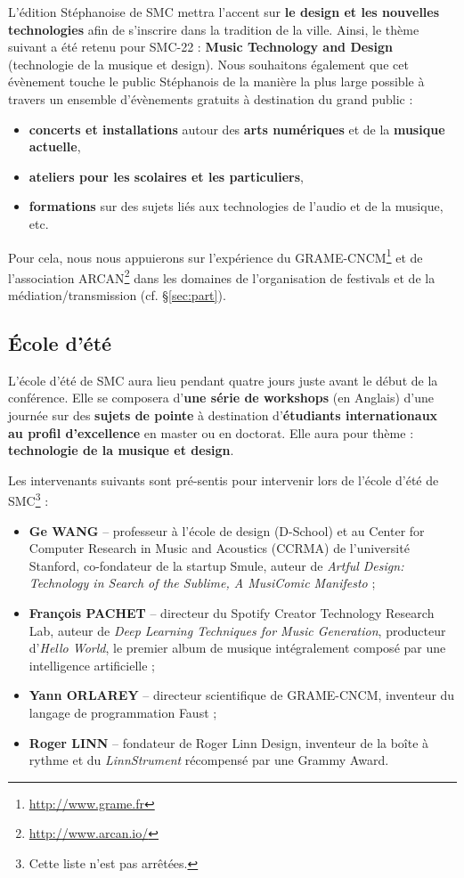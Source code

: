 \documentclass[fontsize=12pt]{scrartcl} %
\numberwithin{equation}{section} %
\numberwithin{figure}{section} %
\numberwithin{table}{section} %
\begin{document}
L'édition Stéphanoise de SMC mettra l'accent sur \textbf{le design et les nouvelles technologies} afin de s'inscrire dans la tradition de la ville. Ainsi, le thème suivant a été retenu pour SMC-22 : \textbf{Music Technology and Design} (technologie de la musique et design). Nous souhaitons également que cet évènement touche le public Stéphanois de la manière la plus large possible à travers un ensemble d'évènements gratuits à destination du grand public : 

\begin{itemize}
\item \textbf{concerts et installations} autour des \textbf{arts numériques} et de la \textbf{musique actuelle},
\item \textbf{ateliers pour les scolaires et les particuliers},
\item \textbf{formations} sur des sujets liés aux technologies de l'audio et de la musique, etc. 
\end{itemize}

Pour cela, nous nous appuierons sur l'expérience du GRAME-CNCM\footnote{\url{http://www.grame.fr}} et de l'association ARCAN\footnote{\url{http://www.arcan.io/}} dans les domaines de l'organisation de festivals et de la médiation/transmission (cf. \S\ref{sec:part}).  

\subsection{École d'été}
\label{subsec:summerSchool}

L'école d'été de SMC aura lieu pendant quatre jours juste avant le début de la conférence. Elle se composera d'\textbf{une série de workshops} (en Anglais) d'une journée sur des \textbf{sujets de pointe} à destination d'\textbf{étudiants internationaux au profil d'excellence} en master ou en doctorat. Elle aura pour thème : \textbf{technologie de la musique et design}.

Les intervenants suivants sont pré-sentis pour intervenir lors de l'école d'été de SMC\footnote{Cette liste n'est pas arrêtées.} :

\begin{itemize}
  \item \textbf{Ge WANG} -- professeur à l'école de design (D-School) et au Center for Computer Research in Music and Acoustics (CCRMA) de l'université Stanford, co-fondateur de la startup Smule, auteur de \textit{Artful Design: Technology in Search of the Sublime, A MusiComic Manifesto} ;
  \item \textbf{François PACHET} -- directeur du Spotify Creator Technology Research Lab, auteur de \textit{Deep Learning Techniques for Music Generation}, producteur d'\textit{Hello World}, le premier album de musique intégralement composé par une intelligence artificielle ;
  \item \textbf{Yann ORLAREY} -- directeur scientifique de GRAME-CNCM, inventeur du langage de programmation Faust ;
  \item \textbf{Roger LINN} -- fondateur de Roger Linn Design, inventeur de la boîte à rythme et du \textit{LinnStrument} récompensé par une Grammy Award.
\end{itemize} 
\end{document}
